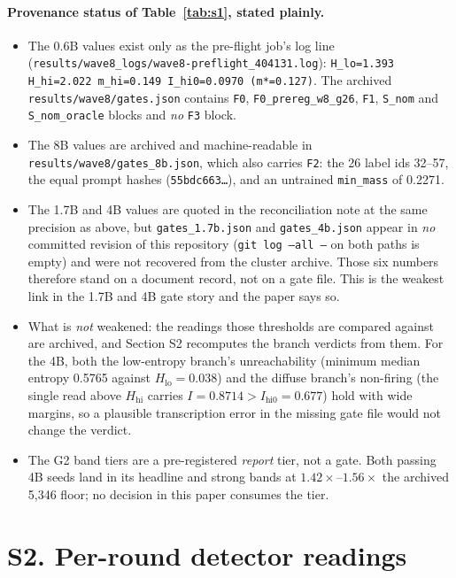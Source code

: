 \documentclass[11pt,a4paper]{article}
\begin{document}
\paragraph{Provenance status of Table~\ref{tab:s1}, stated plainly.}
\begin{itemize}
  \item The 0.6B values exist only as the pre-flight job's log line
  (\texttt{results/wave8\_logs/wave8-preflight\_404131.log}):
  \texttt{H\_lo=1.393 H\_hi=2.022 m\_hi=0.149 I\_hi0=0.0970 (m*=0.127)}.
  The archived \texttt{results/wave8/gates.json} contains \texttt{F0}, \texttt{F0\_prereg\_w8\_g26},
  \texttt{F1}, \texttt{S\_nom} and \texttt{S\_nom\_oracle} blocks and \emph{no} \texttt{F3} block.
  \item The 8B values are archived and machine-readable in \texttt{results/wave8/gates\_8b.json},
  which also carries \texttt{F2}: the 26 label ids 32--57, the equal prompt hashes
  (\texttt{55bdc663\ldots}), and an untrained \texttt{min\_mass} of 0.2271.
  \item The 1.7B and 4B values are quoted in the reconciliation note at the same precision as above,
  but \texttt{gates\_1.7b.json} and \texttt{gates\_4b.json} appear in \emph{no} committed revision
  of this repository (\texttt{git log --all --} on both paths is empty) and were not recovered from
  the cluster archive. Those six numbers therefore stand on a document record, not on a gate file.
  This is the weakest link in the 1.7B and 4B gate story and the paper says so.
  \item What is \emph{not} weakened: the readings those thresholds are compared against are
  archived, and Section S2 recomputes the branch verdicts from them. For the 4B, both the
  low-entropy branch's unreachability (minimum median entropy 0.5765 against
  $H_{\mathrm{lo}}{=}0.038$) and the diffuse branch's non-firing (the single read above
  $H_{\mathrm{hi}}$ carries $I{=}0.8714 > I_{\mathrm{hi0}}{=}0.677$) hold with wide margins, so a
  plausible transcription error in the missing gate file would not change the verdict.
  \item The G2 band tiers are a pre-registered \emph{report} tier, not a gate. Both passing 4B
  seeds land in its headline and strong bands at $1.42\times$--$1.56\times$ the archived 5{,}346
  floor; no decision in this paper consumes the tier.
\end{itemize}

\section{S2. Per-round detector readings}
\end{document}

